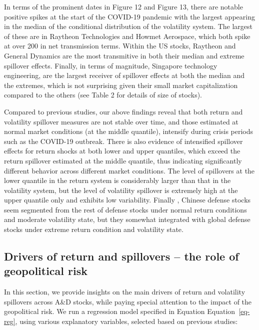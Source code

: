\documentclass[
  letterpaper,
  DIV=11,
  numbers=noendperiod]{scrartcl}
\begin{document}
In terms of the prominent dates in Figure 12 and Figure 13, there are
notable positive spikes at the start of the COVID-19 pandemic with the
largest appearing in the median of the conditional distribution of the
volatility system. The largest of these are in Raytheon Technologies and
Howmet Aerospace, which both spike at over 200 in net transmission
terms. Within the US stocks, Raytheon and General Dynamics are the most
transmitive in both their median and extreme spillover effects. Finally,
in terms of magnitude, Singapore technology engineering, are the largest
receiver of spillover effects at both the median and the extremes, which
is not surprising given their small market capitalization compared to
the others (see Table 2 for details of size of stocks).

Compared to previous studies, our above findings reveal that both return
and volatility spillover measures are not stable over time, and those
estimated at normal market conditions (at the middle quantile),
intensify during crisis periods such as the COVID-19 outbreak. There is
also evidence of intensified spillover effects for return shocks at both
lower and upper quantiles, which exceed the return spillover estimated
at the middle quantile, thus indicating significantly different behavior
across different market conditions. The level of spillovers at the lower
quantile in the return system is considerably larger than that in the
volatility system, but the level of volatility spillover is extremely
high at the upper quantile only and exhibits low variability. Finally ,
Chinese defense stocks seem segmented from the rest of defense stocks
under normal return conditions and moderate volatility state, but they
somewhat integrated with global defense stocks under extreme return
condition and volatility state.

\hypertarget{drivers-of-return-and-spillovers-the-role-of-geopolitical-risk}{%
\subsection{Drivers of return and spillovers -- the role of geopolitical
risk}\label{drivers-of-return-and-spillovers-the-role-of-geopolitical-risk}}

In this section, we provide insights on the main drivers of return and
volatility spillovers across A\&D stocks, while paying special attention
to the impact of the geopolitical risk. We run a regression model
specified in Equation Equation~\ref{eq-reg}, using various explanatory
variables, selected based on previous studies:
\end{document}
